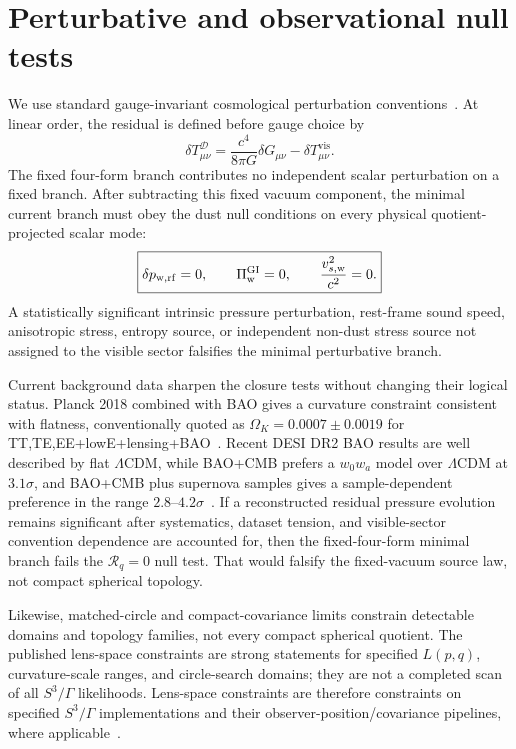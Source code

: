 \documentclass[
  aps,
  prd,
  reprint,
  superscriptaddress,
  floatfix,
  nofootinbib,
  longbibliography
]{revtex4-2}
\theoremstyle{plain}
\theoremstyle{definition}
\theoremstyle{remark}
\newcommand{\D}{\mathcal D}
\newcommand{\vis}{\mathrm{vis}}
\newcommand{\wind}{\mathrm w}
\newcommand{\GI}{\mathrm{GI}}
\newcommand{\Rcl}{\mathcal R}
\begin{document}
\section{Perturbative and observational null tests}

We use standard gauge-invariant cosmological perturbation conventions~\cite{Bardeen,KodamaSasaki,Mukhanov,MaBertschinger}.  At linear order, the residual is defined before gauge choice by
\begin{equation}
\delta T^\D_{\mu\nu}=\frac{c^4}{8\pi G}\delta G_{\mu\nu}
-\delta T^{\vis}_{\mu\nu} .
\label{eq:linear_residual_v5}
\end{equation}
The fixed four-form branch contributes no independent scalar perturbation on a
fixed branch.  After subtracting this fixed vacuum component, the minimal
current branch must obey the dust null conditions on every physical
quotient-projected scalar mode:
\begin{equation}
\boxed{
\delta p_{\wind,{\rm rf}}=0,
\qquad
\Pi_{\wind}^{\GI}=0,
\qquad
\frac{v_{s,\wind}^2}{c^2}=0 .
}
\label{eq:dust_null_conditions_v5}
\end{equation}
A statistically significant intrinsic pressure perturbation, rest-frame sound
speed, anisotropic stress, entropy source, or independent non-dust stress source
not assigned to the visible sector falsifies the minimal perturbative branch.

Current background data sharpen the closure tests without changing their
logical status.  Planck 2018 combined with BAO gives a curvature constraint
consistent with flatness, conventionally quoted as
\(\Omega_K=0.0007\pm0.0019\) for TT,TE,EE+lowE+lensing+BAO~\cite{Planck2018}.
Recent DESI DR2 BAO results are well described by flat \(\Lambda\)CDM, while
BAO+CMB prefers a \(w_0w_a\) model over \(\Lambda\)CDM at \(3.1\sigma\), and
BAO+CMB plus supernova samples gives a sample-dependent preference in the range
\(2.8\)--\(4.2\sigma\)~\cite{DESIDR2}.  If a reconstructed residual
pressure evolution remains significant after systematics, dataset tension, and
visible-sector convention dependence are accounted for, then the fixed-four-form
minimal branch fails the
\(\Rcl_q=0\) null test.  That would falsify the fixed-vacuum source law,
not compact spherical topology.

Likewise, matched-circle and compact-covariance limits constrain detectable
domains and topology families, not every compact spherical quotient.  The
published lens-space constraints are strong statements for specified
\(L(p,q)\), curvature-scale ranges, and circle-search domains; they are not a
completed scan of all \(S^3/\Gamma\) likelihoods.  Lens-space constraints are
therefore constraints on specified \(S^3/\Gamma\) implementations and their
observer-position/covariance pipelines, where applicable~\cite{Cornish,
PlanckTopology,SahaLens}.
\end{document}
